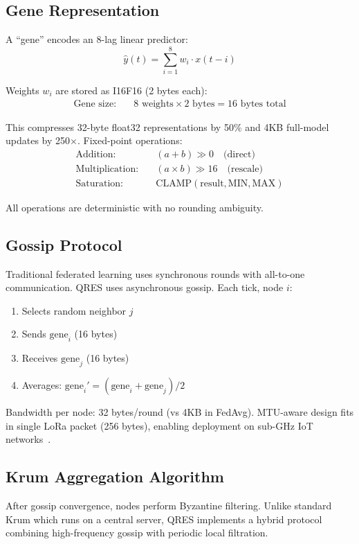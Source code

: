 \documentclass[conference,10pt]{IEEEtran}
\begin{document}
\subsection{Gene Representation}
A ``gene'' encodes an 8-lag linear predictor:
\begin{equation}
\hat{y}(t) = \sum_{i=1}^{8} w_i \cdot x(t-i)
\end{equation}

Weights $w_i$ are stored as I16F16 (2 bytes each):
\begin{align*}
\text{Gene size:} & \quad 8 \text{ weights} \times 2 \text{ bytes} = 16 \text{ bytes total}
\end{align*}

This compresses 32-byte float32 representations by 50\% and 4KB full-model updates by 250$\times$. Fixed-point operations:
\begin{align}
\text{Addition:} & \quad (a + b) \gg 0 \quad \text{(direct)} \\
\text{Multiplication:} & \quad (a \times b) \gg 16 \quad \text{(rescale)} \\
\text{Saturation:} & \quad \text{CLAMP}(\text{result}, \text{MIN}, \text{MAX})
\end{align}

All operations are deterministic with no rounding ambiguity.

\subsection{Gossip Protocol}
Traditional federated learning uses synchronous rounds with all-to-one communication. QRES uses asynchronous gossip. Each tick, node $i$:
\begin{enumerate}
    \item Selects random neighbor $j$
    \item Sends $\text{gene}_i$ (16 bytes)
    \item Receives $\text{gene}_j$ (16 bytes)
    \item Averages: $\text{gene}_i' = (\text{gene}_i + \text{gene}_j) / 2$
\end{enumerate}

Bandwidth per node: 32 bytes/round (vs 4KB in FedAvg). MTU-aware design fits in single LoRa packet (256 bytes), enabling deployment on sub-GHz IoT networks~\cite{adelantado2017understanding}.

\subsection{Krum Aggregation Algorithm}
After gossip convergence, nodes perform Byzantine filtering. Unlike standard Krum which runs on a central server, QRES implements a hybrid protocol combining high-frequency gossip with periodic local filtration.
\end{document}
